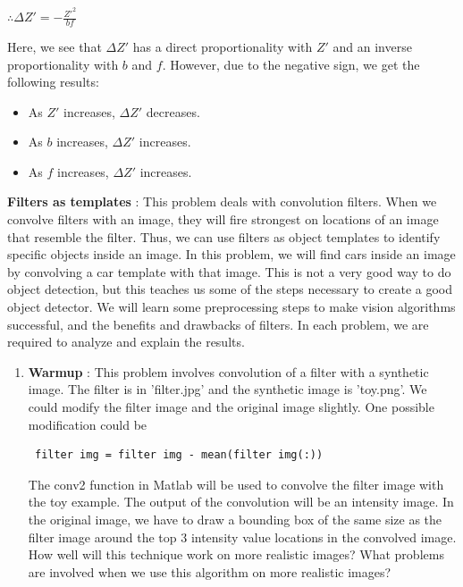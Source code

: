 \documentclass{assignment}
\begin{document}
\begin{problemlist}
$\therefore \Delta Z' = -\frac{Z'^2}{bf}$

Here, we see that $\Delta Z'$ has a direct proportionality with $Z'$ and an inverse proportionality with $b$ and $f$. However, due to the negative sign, we get the following results:

\begin{itemize}

\item As $Z'$ increases, $\Delta Z'$ decreases.

\item As $b$ increases, $\Delta Z'$ increases.

\item As $f$ increases, $\Delta Z'$ increases.

\end{itemize}

\pbitem \textbf{Filters as templates} : This problem deals with convolution filters. When we convolve filters with an image, they will fire strongest on locations of an image that resemble the filter. Thus, we can use filters as object templates to identify specific objects inside an image. In this problem, we will find cars inside an image by convolving a car template with that image. This is not a very good way to do object detection, but this teaches us some of the steps necessary to create a good object detector. We will learn some preprocessing steps to make vision algorithms successful, and the benefits and drawbacks of filters. In each problem, we are required to analyze and explain the results.

\begin{enumerate}[label*=\arabic*.]

\item \textbf{Warmup} : This problem involves convolution of a filter with a synthetic image. The filter is in 'filter.jpg' and the synthetic image is 'toy.png'. We could modify the filter image and the original image slightly. One possible modification could be \begin{verbatim} filter img = filter img - mean(filter img(:)) \end{verbatim}The conv2 function in Matlab will be used to convolve the filter image with the toy example. The output of the convolution will be an intensity image. In the original image, we have to draw a bounding box of the same size as the filter image around the top 3 intensity value locations in the convolved image. How well will this technique work on more realistic images? What problems are involved when we use this algorithm on more realistic images?


\end{enumerate}
\end{problemlist}
\end{document}

